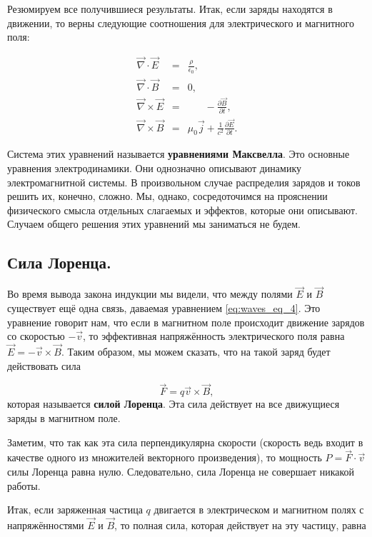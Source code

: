 \documentclass[a4paper,12pt]{article}
\numberwithin{equation}{section}
\newcommand{\pt}{\partial}
\newcommand{\eps}{\epsilon}
\newcommand{\vn}{\vec{\nabla}}
\begin{document}
Резюмируем все получившиеся результаты. Итак, если заряды находятся в
движении, то верны следующие соотношения для электрического и
магнитного поля: 

\begin{eqnarray}
  \label{eq:maxwell_eqs}
  \vn \cdot \vec{E} &=& \frac{\rho}{\eps_0},\\
  \vn \cdot \vec{B} &=& 0,\\
  \vn \times \vec{E} &=& \phantom{\mu_0 \vec{j}} -\frac{\pt \vec{B}}{\pt t},\\
  \vn \times \vec{B} &=& \mu_0 \vec{j} + \frac{1}{c^2}\frac{\pt
    \vec{E}}{\pt t}.
\end{eqnarray}

Система этих уравнений называется \textbf{уравнениями Максвелла}. Это
основные уравнения электродинамики. Они однозначно описывают динамику
электромагнитной системы. В произвольном случае распределия зарядов и
токов решить их, конечно, сложно. Мы, однако, сосредоточимся на
прояснении физического смысла отдельных слагаемых и эффектов, которые
они описывают. Случаем общего решения этих уравнений мы заниматься не
будем. 

\subsection{Сила Лоренца.}
\label{sec:lorentz_force}

Во время вывода закона индукции мы видели, что между полями $\vec{E}$
и $\vec{B}$ существует ещё одна связь, даваемая уравнением
\eqref{eq:waves_eq_4}. Это уравнение говорит нам, что если в магнитном
поле происходит движение зарядов со скоростью $-\vec{v}$, то
эффективная напряжённость электрического поля равна $\vec{E} =
-\vec{v} \times \vec{B}$. Таким образом, мы можем сказать, что на
такой заряд будет действовать сила

\begin{equation}
  \label{eq:lorentz_force}
  \vec{F} = q \vec{v} \times \vec{B},
\end{equation}
которая называется \textbf{силой Лоренца}. Эта сила действует на все
движущиеся заряды в магнитном поле. 

Заметим, что так как эта сила перпендикулярна скорости (скорость ведь
входит в качестве одного из множителей векторного произведения), то
мощность $P = \vec{F} \cdot \vec{v} $ силы Лоренца равна
нулю. Следовательно, сила Лоренца не совершает никакой работы. 

Итак, если заряженная частица $q$ двигается в электрическом и
магнитном полях с напряжённостями $\vec{E}$ и $\vec{B}$, то полная
сила, которая действует на эту частицу, равна
\end{document}
